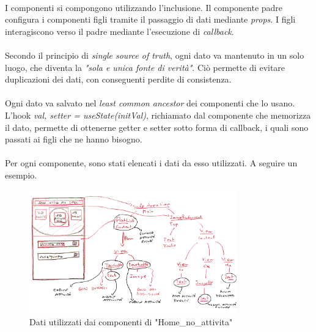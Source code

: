 \documentclass[12pt,a4paper,twoside,english,italian]{book}
\begin{document}
\paragraph{} I componenti si compongono utilizzando l'inclusione. Il componente padre configura i componenti figli tramite il passaggio di dati mediante \emph{props}. I figli interagiscono verso il padre mediante l'esecuzione di \emph{callback}.

\paragraph{} Secondo il principio di \emph{single source of truth}, ogni dato va mantenuto in un solo luogo, che diventa la \emph{"sola e unica fonte di verità"}. Ciò permette di evitare duplicazioni dei dati, con conseguenti perdite di consistenza. 

\paragraph{} Ogni dato va salvato nel \emph{least common ancestor} dei componenti che lo usano. L'hook \emph{val, setter = useState(initVal)}, richiamato dal componente che memorizza il dato, permette di ottenerne getter e setter sotto forma di callback, i quali sono passati ai figli che ne hanno bisogno.

\paragraph{} Per ogni componente, sono stati elencati i dati da esso utilizzati. A seguire un esempio. 

\begin{figure}[H]
    \centering
    \includegraphics[width=0.8\textwidth]{img/componenti home dati.pdf}
    \caption{Dati utilizzati dai componenti di "Home\_no\_attivita"}
\end{figure}
\end{document}
